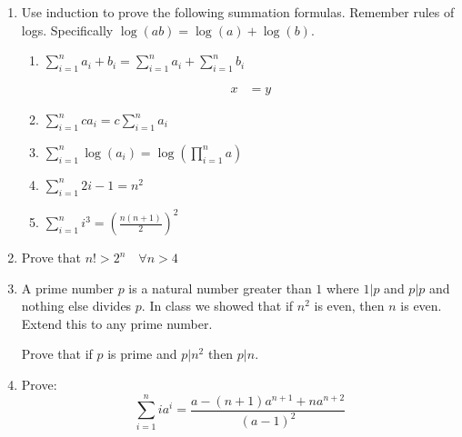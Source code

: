 \documentclass[basic, header]{nosvagor-notes}
\begin{document}
\begin{enumerate}[itemsep=4em]

  \item Use induction to prove the following summation formulas. Remember rules
    of logs. Specifically \(\log(ab) = \log(a) + \log(b)\).
    \begin{enumerate}[leftmargin=2em]
      \item \(\displaystyle \sum_{i=1}^{n} a_i + b_i = \sum_{i=1}^{n} a_i + \sum_{i=1}^{n} b_i  \)

        \begin{align*}
           x &= y
        \end{align*}

      \item \(\displaystyle \sum_{i=1}^{n}ca_i = c \sum_{i=1}^{n} a_i \)

      \item \(\displaystyle \sum_{i=1}^{n} \log(a_i) = \log \left( \prod_{i=1}^{n} a \right) \)

      \item \(\displaystyle \sum_{i=1}^{n} 2i - 1 = n^2 \)

      \item \(\displaystyle \sum_{i=1}^{n} i^3 = \left( \frac{n(n+1)}{2} \right)^2 \)

    \end{enumerate}

  \newpage %

  \item Prove that \(\displaystyle n! > 2^n \quad \forall n > 4 \)

  \item A prime number \(p\) is a natural number greater than \(1\) where
    \(1|p\) and \(p|p\) and nothing else divides \(p\). In class we showed that
    if \(n^2\) is even, then \(n\) is even. Extend this to any prime number.

    Prove that if \(p\) is prime and \(p|n^2\) then \(p|n\).

  \newpage %

  \item Prove:
    \[%
      \sum_{i=1}^{n} ia^i = \frac{a-(n+1)a^{n+1} + na^{n+2}}{(a-1)^2}
    \]%


\end{enumerate}
\end{document}
